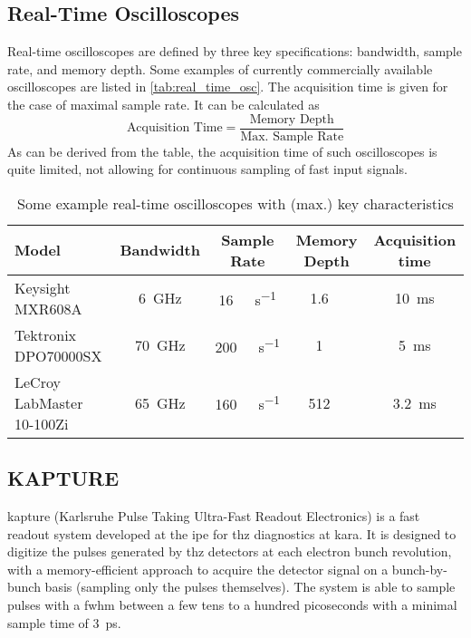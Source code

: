 \subsection*{Real-Time Oscilloscopes}
Real-time oscilloscopes are defined by three key specifications: bandwidth, sample rate, and memory depth.
Some examples of currently commercially available oscilloscopes are listed in \autoref{tab:real_time_osc}.
The acquisition time is given for the case of maximal sample rate.
It can be calculated as 
\begin{equation}
	\text{Acquisition Time} = \frac{\text{Memory Depth}}{\text{Max. Sample Rate}}
\end{equation}
As can be derived from the table, the acquisition time of such oscilloscopes is quite limited, not allowing for continuous sampling of fast input signals.
\begingroup
\renewcommand{\arraystretch}{1.4}
\begin{table}[tb]
	\caption[Real Time Oscilloscopes Examples]{Some example real-time oscilloscopes with (max.) key characteristics}
	\label{tab:real_time_osc}
	\centering
	\begin{tabularx}{\textwidth}{Xcccc}
		\toprule
		\textbf{Model}            & \textbf{Bandwidth} &         \textbf{Sample Rate}         &  \textbf{Memory Depth}  & \textbf{Acquisition time} \\ \midrule
		Keysight MXR608A          &    \SI{6}{\GHz}    & \SI{16}{\giga \sample \per \second}  & \SI{1.6}{\giga \sample} &  \SI{10}{\milli \second}  \\
		Tektronix DPO70000SX      &   \SI{70}{\GHz}    & \SI{200}{\giga \sample \per \second} &  \SI{1}{\giga \sample}  &  \SI{5}{\milli \second}   \\
		LeCroy LabMaster 10-100Zi &   \SI{65}{\GHz}    & \SI{160}{\giga \sample \per \second} & \SI{512}{\mega \sample} & \SI{3.2}{\milli \second}  \\ \bottomrule
	\end{tabularx}
\end{table}
\endgroup

\subsection{KAPTURE}
\Gls{kapture} (Karlsruhe Pulse Taking Ultra-Fast Readout Electronics) is a fast readout system developed at the \gls{ipe} for \gls{thz} diagnostics at \gls{kara}. 
It is designed to digitize the pulses generated by \gls{thz} detectors at each electron bunch revolution, with a memory-efficient approach to acquire the detector signal on a bunch-by-bunch basis (sampling only the pulses themselves). 
The system is able to sample pulses with a \gls{fwhm} between a few tens to a hundred picoseconds with a minimal sample time of \SI{3}{\pico \second}. \cite{caselleKAP}

